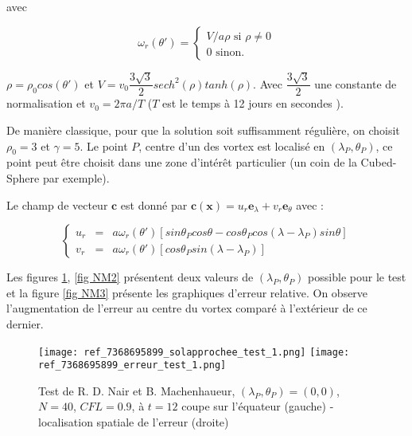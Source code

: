 avec

\begin{equation}
\label{rotation_r}
\omega_r(\theta') = \left\lbrace
\begin{array}{ll}
V/a\rho \text{ si } \rho \neq 0\\
0 \text{ sinon.}
\end{array}
\right.
\end{equation}

$\rho = \rho_0 cos ( \theta' )$ et $V =v_0 \dfrac{3 \sqrt{3}}{2} sech^2 ( \rho )  tanh( \rho )$. Avec $\dfrac{3 \sqrt{3}}{2}$ une constante de normalisation et $v_0 = 2 \pi a / T$ ($T$ est le temps à 12 jours en secondes ).

De manière classique, pour que la solution soit suffisamment régulière, on choisit $\rho_0 = 3$ et $\gamma = 5$.
Le point $P$, centre d'un des vortex est localisé en $( \lambda_P, \theta_P)$, ce point peut être choisit dans une zone d'intérêt particulier (un coin de la Cubed-Sphere par exemple).

Le champ de vecteur $\mathbf{c}$ est donné par $\mathbf{c}( \mathbf{x} ) = u_r \mathbf{e}_{\lambda} + v_r \mathbf{e}_{\theta}$ avec :

\begin{equation}
\left\lbrace
\begin{array}{rcl}
u_r & = & a \omega_r ( \theta' ) \left[ sin \theta_P cos \theta - cos \theta_P cos( \lambda - \lambda_P ) sin \theta \right] \\
v_r & = & a \omega_r ( \theta' ) \left[ cos \theta_P sin ( \lambda - \lambda_P) \right]
\end{array}
\right.
\end{equation}

Les figures \ref{fig NM1}, \ref{fig NM2} présentent deux valeurs de $(\lambda_P, \theta_P)$ possible pour le test et la figure \ref{fig NM3} présente les graphiques d'erreur relative. On observe l'augmentation de l'erreur au centre du vortex comparé à l'extérieur de ce dernier.

\begin{figure}[ht]
\begin{center}
\texttt{[image: ref\_7368695899\_solapprochee\_test\_1.png]}
\texttt{[image: ref\_7368695899\_erreur\_test\_1.png]}
\caption{Test de R. D. Nair et B. Machenhaueur, $(\lambda_P, \theta_P) = (0,0)$, $N=40$, $CFL=0.9$, à $t=12$ coupe sur l'équateur (gauche) - localisation spatiale de l'erreur (droite)}
\label{fig NM1}
\end{center}
\end{figure}

